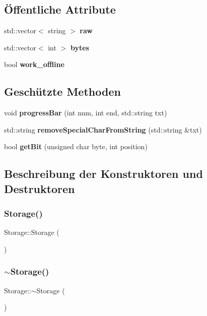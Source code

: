 \subsection*{Öffentliche Attribute}
\begin{DoxyCompactItemize}
\item 
std\+::vector$<$ string $>$ \textbf{ raw}
\item 
std\+::vector$<$ int $>$ \textbf{ bytes}
\item 
bool \textbf{ work\+\_\+offline}
\end{DoxyCompactItemize}
\subsection*{Geschützte Methoden}
\begin{DoxyCompactItemize}
\item 
void \textbf{ progress\+Bar} (int num, int end, std\+::string txt)
\item 
std\+::string \textbf{ remove\+Special\+Char\+From\+String} (std\+::string \&txt)
\item 
bool \textbf{ get\+Bit} (unsigned char byte, int position)
\end{DoxyCompactItemize}


\subsection{Beschreibung der Konstruktoren und Destruktoren}
\mbox{\label{class_storage_a80ef6af5e4c9fd4424ae16e808d05291}} 
\subsubsection{Storage()}
{\footnotesize\ttfamily Storage\+::\+Storage (\begin{DoxyParamCaption}{ }\end{DoxyParamCaption})}

\mbox{\label{class_storage_a73cf30f0a34250396f9eabee7dc5c93d}} 
\subsubsection{$\sim$\+Storage()}
{\footnotesize\ttfamily Storage\+::$\sim$\+Storage (\begin{DoxyParamCaption}{ }\end{DoxyParamCaption})\hspace{0.3cm}{\ttfamily [virtual]}}




